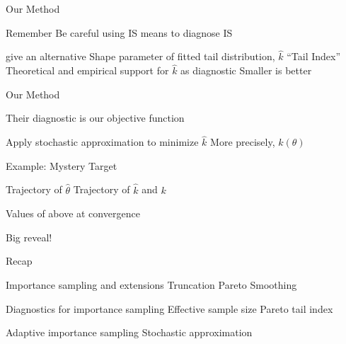 \documentclass[14pt]{beamer}
\begin{document}
\begin{frame}{Our Method}
    \begin{outline}
        \1 Remember \citeauthor{Cha18}
            \2 Be careful using IS means to diagnose IS \newline
        
        \1 \citeauthor{Veh22} give an alternative
            \2 Shape parameter of fitted tail distribution, $\hat{k}$
            \2 ``Tail Index''
        \1 Theoretical and empirical support for $\hat{k}$ as diagnostic
            \2 Smaller is better
    \end{outline}
\end{frame}

\begin{frame}{Our Method}
    \begin{outline}
        \1 Their diagnostic is our objective function \newline

        \1 Apply stochastic approximation to minimize $\hat{k}$
            \2 More precisely, $k(\theta)$
    \end{outline}
\end{frame}

\begin{frame}{Example: Mystery Target}
    \begin{outline}
        \1 Trajectory of $\hat{\theta}$
        \1 Trajectory of $\hat{k}$ and $k$ \newline

        \1 Values of above at convergence \newline

        \1 Big reveal!
    \end{outline}
\end{frame}

\begin{frame}{Recap}
    \begin{outline}
        \1 Importance sampling and extensions
            \2 Truncation
            \2 Pareto Smoothing \newline
        
        \1 Diagnostics for importance sampling
            \2 Effective sample size
            \2 Pareto tail index \newline

        \1 Adaptive importance sampling
            \2 Stochastic approximation
    \end{outline}
\end{frame}
\end{document}
